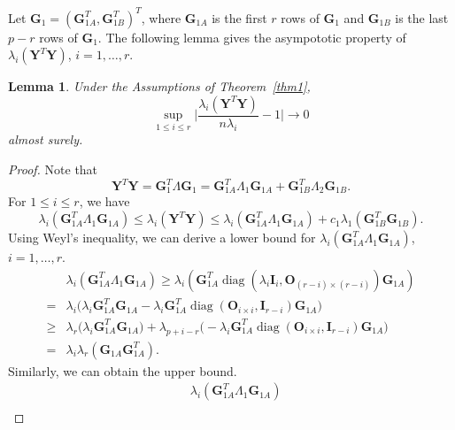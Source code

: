 \documentclass[12pt]{article} %
\DeclareMathOperator{\mydiag}{diag}
\newcommand{\bA}{\mathbf{A}}
\newcommand{\bY}{\mathbf{Y}}
\newcommand{\bG}{\mathbf{G}}
\newcommand{\bO}{\mathbf{O}}
\newcommand{\bI}{\mathbf{I}}
\newcommand{\bD}{\mathbf{D}}
\newcommand{\bV}{\mathbf{V}}
\newtheorem{lemma}{Lemma}
\theoremstyle{definition}
\begin{document}
Let $\bG_1=(\bG_{1A}^T,\bG_{1B}^T)^T$, where $\bG_{1A}$ is the first $r$ rows of $\bG_1$ and $\bG_{1B}$ is the last $p-r$ rows of $\bG_1$.
The following lemma gives the asympototic property of $\lambda_{i}(\bY^T \bY)$, $i=1,\ldots, r$.
\begin{lemma}\label{PCAlemma1}
    Under the Assumptions of Theorem~\ref{thm1}, 
    $$\sup_{1\leq i\leq r}\Big|\frac{\lambda_{i}(\bY^T \bY)}{n\lambda_i}-1\Big|\to 0$$
    almost surely.
\end{lemma}
\begin{proof}
    Note that
$$
\bY^T \bY =\bG_1^T \Lambda \bG_1
=
\bG_{1A}^T \Lambda_1 \bG_{1A}+
\bG_{1B}^T \Lambda_2 \bG_{1B}.
$$
For $1\leq i \leq r$, we have
    \begin{equation}\label{eq:DLU}
\lambda_i(\bG_{1A}^T \Lambda_1 \bG_{1A})
    \leq \lambda_i(\bY^T \bY) \leq \lambda_i(\bG_{1A}^T \Lambda_1 \bG_{1A})+
    c_1 \lambda_1(\bG_{1B}^T  \bG_{1B}).
    \end{equation}
 Using Weyl's inequality, we can derive a lower bound for $\lambda_i(\bG_{1A}^T \Lambda_1 \bG_{1A})$, $ i=1,\ldots, r$.
\begin{equation}\label{eq:DLower}
\begin{aligned}
&\lambda_i(\bG_{1A}^T \Lambda_1 \bG_{1A})
\geq
\lambda_i(\bG_{1A}^T \mydiag(\lambda_i \bI_{i},\bO_{(r-i)\times(r-i)}) \bG_{1A})
\\
    =&
    \lambda_i\Big( \lambda_i \bG_{1A}^T \bG_{1A}-\lambda_i\bG_{1A}^T \mydiag(\bO_{i\times i}, \bI_{r-i}) \bG_{1A}\Big)\\
    \geq&
    \lambda_r\Big( \lambda_i \bG_{1A}^T \bG_{1A}\Big)+\lambda_{p+i-r}\Big(-\lambda_i\bG_{1A}^T \mydiag(\bO_{i\times i}, \bI_{r-i}) \bG_{1A}\Big)\\
= &
\lambda_i \lambda_r(\bG_{1A}\bG_{1A}^T).
\end{aligned}
\end{equation}
Similarly, we can obtain the upper bound.
\begin{equation}\label{eq:DUpper}
\begin{aligned}
&\lambda_i(\bG_{1A}^T \Lambda_1 \bG_{1A})
\\

\end{aligned}
\end{equation}
\end{proof}
\end{document}
